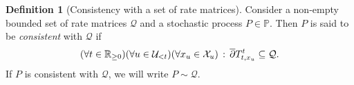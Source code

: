 \documentclass[10pt,a4paper]{paper}
\theoremstyle{definition}
\newtheorem{definition}{Definition}
\newcommand{\reals}{\mathbb{R}}
\newcommand{\realsnonneg}{\reals_{\geq 0}}
\newcommand{\states}{\mathcal{X}}
\newcommand{\processes}{\mathbb{P}}
\newcommand{\rateset}{\mathcal{Q}}
\begin{document}


\begin{definition}[Consistency with a set of rate matrices]\label{def:consistent_process}
Consider a non-empty bounded set of rate matrices $\rateset$ and a stochastic process $P\in\processes$. Then $P$ is said to be \emph{consistent} with $\rateset$ if
\begin{equation*}
(\forall t\in\realsnonneg)(\forall u\in\mathcal{U}_{<t})(\forall x_u\in\states_u)\,:\, \smash{\overline{\partial}}T_{t,x_u}^t \subseteq \rateset.
\vspace{4pt}
\end{equation*}
If $P$ is consistent with $\rateset$, we will write $P\sim\rateset$.
\end{definition}
\end{document}
